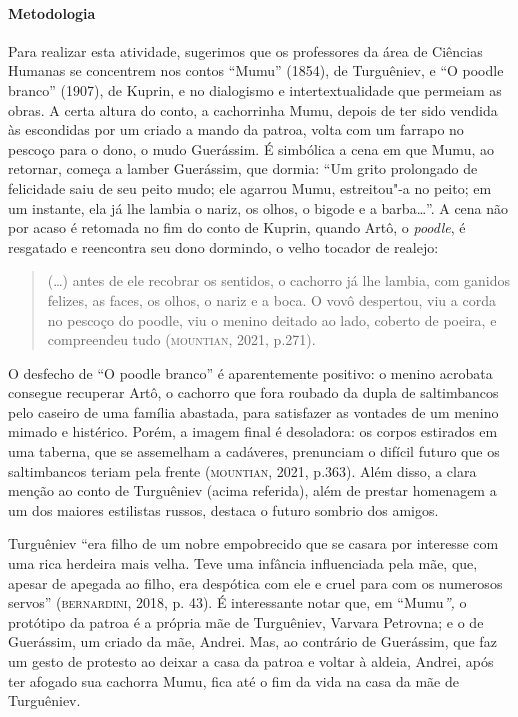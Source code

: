 \documentclass[11pt]{extarticle}
\begin{document}
\paragraph{Metodologia}
Para realizar esta atividade, sugerimos que os professores da área de Ciências Humanas se concentrem nos
contos ``Mumu'' (1854), de Turguêniev, e ``O poodle branco''
(1907), de Kuprin, e no dialogismo e intertextualidade que permeiam as
obras. A certa altura do conto, a cachorrinha Mumu, depois de ter sido
vendida às escondidas por um criado a mando da patroa, volta com um farrapo no pescoço para o
dono, o mudo Guerássim. É simbólica a cena em
que Mumu, ao retornar, começa a lamber Guerássim, que dormia: ``Um grito
prolongado de felicidade saiu de seu peito mudo; ele agarrou Mumu,
estreitou"-a no peito; em um instante, ela já lhe lambia o nariz, os
olhos, o bigode e a barba\ldots{}''. A cena não por acaso é retomada no fim
do conto de Kuprin, quando Artô, o \emph{poodle}, é resgatado e
reencontra seu dono dormindo, o velho tocador de realejo:

\begin{quote}
(\ldots{}) antes de ele recobrar os sentidos, o cachorro já lhe lambia, com
ganidos felizes, as faces, os olhos, o nariz e a boca. O vovô despertou,
viu a corda no pescoço do poodle, viu o menino deitado ao lado, coberto
de poeira, e compreendeu tudo (\textsc{mountian}, 2021, p.271).
\end{quote}


O desfecho de ``O poodle branco'' é aparentemente positivo: o menino
acrobata consegue recuperar Artô, o cachorro que fora roubado da dupla
de saltimbancos pelo caseiro de uma família abastada, para satisfazer as
vontades de um menino mimado e histérico. Porém, a imagem final é
desoladora: os corpos estirados em uma taberna, que se assemelham a
cadáveres, prenunciam o difícil futuro que os saltimbancos teriam pela
frente (\textsc{mountian}, 2021, p.363). Além disso, a clara menção ao conto de
Turguêniev (acima referida), além de prestar homenagem a um dos maiores
estilistas russos, destaca o futuro sombrio dos amigos.

Turguêniev ``era filho de um nobre empobrecido que se casara por
interesse com uma rica herdeira mais velha. Teve uma infância
influenciada pela mãe, que, apesar de apegada ao filho, era despótica
com ele e cruel para com os numerosos servos'' (\textsc{bernardini}, 2018, p.
43). É interessante notar que, em ``Mumu\emph{'',} o protótipo da patroa
é a própria mãe de Turguêniev, Varvara Petrovna; e o de Guerássim, um
criado da mãe, Andrei. Mas, ao contrário de Guerássim, que faz um gesto
de protesto ao deixar a casa da patroa e voltar à aldeia, Andrei, após
ter afogado sua cachorra Mumu, fica até o fim da vida na casa da mãe de
Turguêniev.
\end{document}
